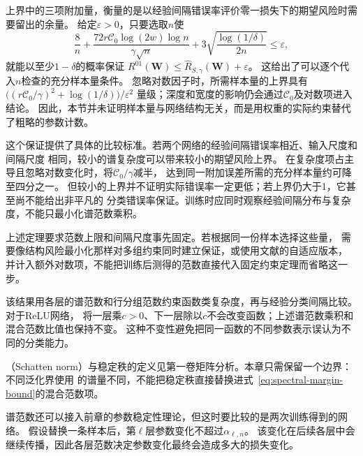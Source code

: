 上界中的三项附加量，衡量的是以经验间隔错误率评价零一损失下的期望风险时需要留出的余量。
给定$\varepsilon>0$，只要选取$n$使
\[
 \frac8n+\frac{72r\mathcal C_0\log(2w)\log n}{\gamma\sqrt n}
 +3\sqrt{\frac{\log(1/\delta)}{2n}}\leq\varepsilon,
\]
就能以至少$1-\delta$的概率保证
$R^{01}(\bm W)\leq\hat R_{S,\gamma}(\bm W)+\varepsilon$。
这给出了可以逐个代入$n$检查的充分样本量条件。
忽略对数因子时，所需样本量的上界具有
$\bigl((r\mathcal C_0/\gamma)^2+\log(1/\delta)\bigr)/\varepsilon^2$
量级；深度和宽度的影响仍会通过$\mathcal C_0$及对数项进入结论。
因此，本节并未证明样本量与网络结构无关，而是用权重的实际约束替代了粗略的参数计数。

这个保证提供了具体的比较标准。若两个网络的经验间隔错误率相近、输入尺度和间隔尺度
相同，较小的谱复杂度可以带来较小的期望风险上界。
在复杂度项占主导且忽略对数变化时，将$\mathcal C_0/\gamma$减半，
达到同一附加误差所需的充分样本量约可降至四分之一。
但较小的上界并不证明实际错误率一定更低；若上界仍大于1，它甚至尚不能给出非平凡的
分类错误率保证。训练时应同时观察经验间隔分布与复杂度，不能只最小化谱范数乘积。

上述定理要求范数上限和间隔尺度事先固定。若根据同一份样本选择这些量，
需要像结构风险最小化那样对多组约束同时建立保证，或使用文献的自适应版本，
并计入额外对数项，不能把训练后测得的范数直接代入固定约束定理而省略这一步。

该结果用各层的谱范数和行分组范数约束函数类复杂度，再与经验分类间隔比较。对于ReLU网络，
将一层乘$c>0$、下一层除以$c$不会改变函数；上述谱范数乘积和混合范数比值也保持不变。
这种不变性避免把同一函数的不同参数表示误认为不同的分类能力。

（Schatten norm）与稳定秩的定义见第一卷矩阵分析。本章只需保留一个边界：不同泛化界使用
的谱量不同，不能把稳定秩直接替换进式~\eqref{eq:spectral-margin-bound}的混合范数项。

谱范数还可以接入前章的参数稳定性理论，但这时要比较的是两次训练得到的网络。
假设替换一条样本后，第$\ell$层参数变化不超过$\alpha_{\ell,n}$。
该变化在后续各层中会继续传播，因此各层范数决定参数变化最终会造成多大的损失变化。

